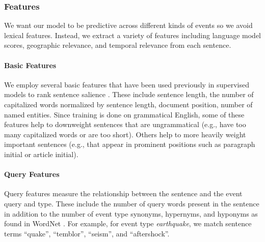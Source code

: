 \subsubsection{Features}
We want our model to be predictive across different kinds of events so we avoid lexical features.  Instead, we extract a variety of features including language model scores, geographic relevance, and temporal relevance from each sentence.  

\paragraph{Basic Features}

We employ several basic features that have been used previously in supervised models to rank sentence salience \cite{kupiec1995trainable,conroy2001using}. These include sentence length, the number of capitalized words normalized by sentence length, document position, number of named entities.  
Since training is done on grammatical English, some of these features help
to downweight sentences that are ungrammatical (e.g., have too many capitalized words or are too short).
Others help to more heavily weight important sentences (e.g., that appear in
prominent positions such as paragraph initial or article initial).

\paragraph{Query Features}

Query features measure the relationship between the sentence and the event query and type.  These include the number of query words present in the sentence in addition to the number of event type synonyms, hypernyms, and hyponyms as found in WordNet \cite{miller1995wordnet}.  For example, for event type \emph{earthquake},  we match sentence terms ``quake'', ``temblor'', ``seism'', and ``aftershock''.

